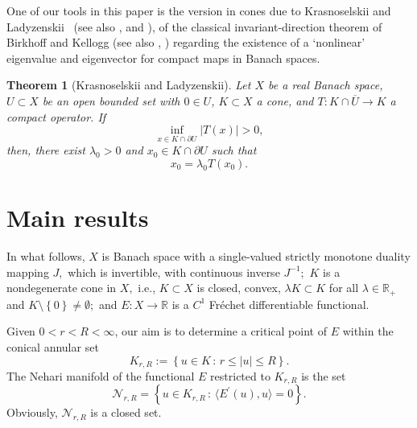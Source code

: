 \documentclass{birkjour}
\newtheorem{theorem}{Theorem}[section]
\theoremstyle{definition}
\theoremstyle{remark}
\numberwithin{equation}{section}
\begin{document}
One of our tools in this paper is the version in cones due to Krasnoselskii
and Ladyzenskii\ \cite{kl} (see also \cite[p.139]{ag}, \cite{guo} and \cite%
{cir}), of the classical invariant-direction theorem of Birkhoff and Kellogg
\cite{bk} (see also \cite{ag1}, \cite[Theorem 6.6]{ag}) regarding the
existence of a `nonlinear' eigenvalue and eigenvector for compact maps in
Banach spaces.

\begin{theorem}[Krasnoselskii and Ladyzenskii]
\label{tkl}Let $X$ be a real Banach space, $U\subset X$ be an open bounded
set with $0\in U$, $K\subset X$ a cone, and $T:K\cap \overline{U}\rightarrow
K$ a compact operator. If
\begin{equation*}
\inf_{x\in K\cap \partial U}\left\vert T\left( x\right) \right\vert >0,
\end{equation*}%
then, there exist $\lambda _{0}>0$ and $x_{0}\in K\cap \partial U$ such that
\begin{equation*}
x_{0}=\lambda _{0}T\left( x_{0}\right) .
\end{equation*}
\end{theorem}

\section{Main results}

In what follows, $X$ is Banach space with a single-valued strictly monotone
duality mapping $J,$ which is invertible, with continuous inverse $J^{-1};$ $%
K$ is a nondegenerate cone in $X,$ i.e., $K\subset X$ is closed, convex, $%
\lambda K\subset K$ for all $\lambda \in
\mathbb{R}
_{+}$ and $K\setminus \left\{ 0\right\} \neq \emptyset ;$ and $%
E:X\rightarrow \mathbb{R}$ is a $C^{1}$ Fr\'{e}chet differentiable
functional.

Given $0<r<R<\infty $, our aim is to determine a critical point of $E$
within the conical annular set
\begin{equation*}
K_{r,R}:=\left\{ u\in K\,:\,r\leq \left\vert u\right\vert \leq R\right\} .
\end{equation*}%
The Nehari manifold of the functional $E$ restricted to $K_{r,R}$ is the set
\begin{equation*}
\mathcal{N}_{r,R}=\left\{ u\in K_{r,R}\,:\,\langle E^{\prime }(u),u\rangle
=0\right\} .
\end{equation*}%
Obviously, $\mathcal{N}_{r,R}$ is a closed set.
\end{document}
